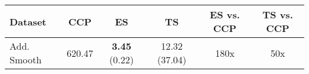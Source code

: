 \begin{tabular}{lccccc}
\toprule
Dataset & CCP & ES & TS & ES vs. CCP & TS vs. CCP \\
\midrule
Add. Smooth & 620.47 & \textbf{3.45} (0.22) & 12.32 (37.04) & 180x & 50x \\
\bottomrule
\end{tabular}